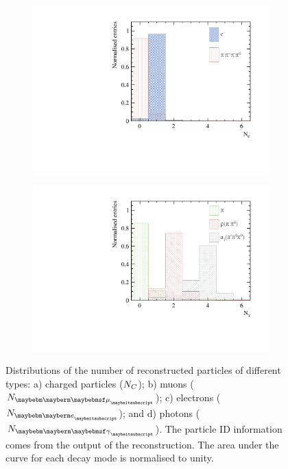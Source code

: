 \begin{figure}[htbp]
\begin{subfigure}[b]{0.45\textwidth}
 \includegraphics[width=\textwidth]{tau/var3/nElectron_100GeV_improved.pdf}
  \caption{}
  \label{fig:tauVarNElectron}
\end{subfigure}
\begin{subfigure}[b]{0.45\textwidth}
 \includegraphics[width=\textwidth]{tau/var3/nPhoton_100GeV_improved.pdf}
  \caption{}
  \label{fig:tauVarNPhoton}
\end{subfigure}
\caption
{Distributions of  the number of reconstructed particles of different types: a)  charged particles (${N}_{C}$); b) muons (${N}_{\Pmu}$); c) electrons (${N}_{\Pe}$); and d)  photons (${N}_{\Pgg}$). The particle ID information comes from the output of the \pandora reconstruction. The area under the curve for each decay mode is normalised to unity.}
\label{fig:tauVar1}
\end{figure}

